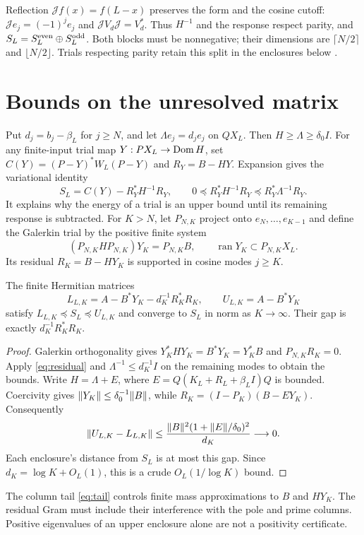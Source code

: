 Reflection $\mathcal Jf(x)=f(L-x)$ preserves the form and the cosine
cutoff: $\mathcal Je_j=(-1)^je_j$ and
$\mathcal JV_d\mathcal J=V_d^*$. Thus $H^{-1}$ and the response respect
parity, and $S_L=S_L^{\rm even}\oplus S_L^{\rm odd}$. Both blocks must be
nonnegative; their dimensions are $\lceil N/2\rceil$ and $\lfloor N/2\rfloor$.
Trials respecting parity retain this split in the enclosures below
\cite[Sections 6--7]{Companion}.

\section{Bounds on the unresolved matrix}
Put $d_j=b_j-\beta_L$ for $j\ge N$, and let $\Lambda e_j=d_je_j$ on
$QX_L$. Then $H\ge\Lambda\ge\delta_0I$. For any finite-input trial map
$Y:PX_L\to\operatorname{Dom} H$, set $C(Y)=(P-Y)^*W_L(P-Y)$ and $R_Y=B-HY$.
Expansion gives the variational identity
\begin{equation}\label{eq:residual}
S_L=C(Y)-R_Y^*H^{-1}R_Y,\qquad
0\preceq R_Y^*H^{-1}R_Y\preceq R_Y^*\Lambda^{-1}R_Y.
\end{equation}
It explains why the energy of a trial is an upper bound until its
remaining response is subtracted.
For $K>N$, let $P_{N,K}$ project onto $e_N,\ldots,e_{K-1}$ and define
the Galerkin trial by the positive finite system
\[
(P_{N,K}HP_{N,K})Y_K=P_{N,K}B,\qquad
\operatorname{ran}Y_K\subset P_{N,K}X_L.
\]
Its residual $R_K=B-HY_K$ is supported in cosine modes $j\ge K$.
\begin{theorem}\label{thm:enclosure}
The finite Hermitian matrices
\begin{equation}\label{eq:lower-matrix}
L_{L,K}=A-B^*Y_K-d_K^{-1}R_K^*R_K,\qquad
U_{L,K}=A-B^*Y_K
\end{equation}
satisfy $L_{L,K}\preceq S_L\preceq U_{L,K}$ and converge to $S_L$ in norm
as $K\to\infty$. Their gap is exactly $d_K^{-1}R_K^*R_K$.
\end{theorem}
\begin{proof}
Galerkin orthogonality gives
$Y_K^*HY_K=B^*Y_K=Y_K^*B$ and $P_{N,K}R_K=0$.
Apply \eqref{eq:residual} and
$\Lambda^{-1}\le d_K^{-1}I$ on the remaining modes to obtain the bounds.
Write $H=\Lambda+E$, where $E=Q(K_L+R_L+\beta_LI)Q$ is bounded.
Coercivity gives $\lVert Y_K\rVert\le\delta_0^{-1}\lVert B\rVert$, while
$R_K=(I-P_K)(B-EY_K)$. Consequently
\[
\lVert U_{L,K}-L_{L,K}\rVert
\le\frac{\lVert B\rVert^2(1+\lVert E\rVert/\delta_0)^2}{d_K}\longrightarrow0.
\]
Each enclosure's distance from $S_L$ is at most this gap.
Since $d_K=\log K+O_L(1)$, this is a crude $O_L(1/\log K)$ bound.
\end{proof}
The column tail \eqref{eq:tail} controls finite mass approximations to $B$
and $HY_K$. The residual Gram must include their interference with the
pole and prime columns. Positive eigenvalues of an upper enclosure alone
are not a positivity certificate.

